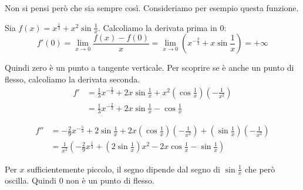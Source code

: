 Non si pensi però che sia sempre così. Consideriamo per esempio questa funzione.
\begin{example}
Sia $f(x) = x^\frac{1}{3} + x^2\sin\frac{1}{x}$. Calcoliamo la derivata prima in 0:
\begin{equation*}
f'(0) = \lim_{x \to 0} \frac{f(x)-f(0)}{x} = \lim_{x \to 0} \left(x^{-\frac{2}{3}} + x\sin\frac{1}{x}\right) = +\infty
\end{equation*}

Quindi zero è un punto a tangente verticale. Per scoprire se è anche un punto di flesso, calcoliamo la derivata seconda.
\begin{align*}
f' &= \frac{1}{3}x^{-\frac{2}{3}} + 2x\sin\frac{1}{x} + x^2\left(\cos\frac{1}{x}\right)\left(-\frac{1}{x^2}\right) \\
&= \frac{1}{3}x^{-\frac{2}{3}} + 2x\sin\frac{1}{x} -\cos\frac{1}{x}
\end{align*}

\begin{align*}
f'' &= -\frac{2}{9}x^{-\frac{5}{3}} + 2\sin\frac{1}{x} + 2x\left(\cos\frac{1}{x}\right)\left(-\frac{1}{x^2}\right) + \left(\sin\frac{1}{x}\right)\left(-\frac{1}{x^2}\right) \\
&= \frac{1}{x^2} \left(-\frac{2}{9}x^{\frac{1}{3}} + \left(2\sin\frac{1}{x}\right)x^2 -2x\cos\frac{1}{x} - \sin\frac{1}{x} \right)
\end{align*}

Per $x$ sufficientemente piccolo, il segno dipende dal segno di $\sin\frac{1}{x}$ che però oscilla. Quindi 0 non è un punto di flesso.
\end{example}
